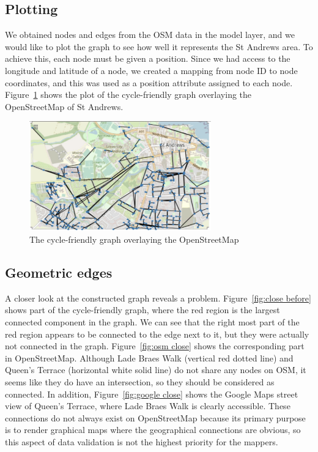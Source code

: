 \documentclass[12pt,a4paper]{report}
\begin{document}
\subsection{Plotting}
We obtained nodes and edges from the OSM data in the model layer, and we would like to plot the graph to see how well it represents the St Andrews area. To achieve this, each node must be given a position. Since we had access to the longitude and latitude of a node, we created a mapping from node ID to node coordinates, and this was used as a position attribute assigned to each node. Figure~\ref{fig:graph layout} shows the plot of the cycle-friendly graph overlaying the OpenStreetMap of St Andrews.

\begin{figure}[ht]
    \centering
    \includegraphics[width=0.7\textwidth]{diss_images/impl/graph_layout.png}
    \caption{The cycle-friendly graph overlaying the OpenStreetMap}
    \label{fig:graph layout}
\end{figure}

\subsection{Geometric edges}
A closer look at the constructed graph reveals a problem. Figure~\ref{fig:close before} shows part of the cycle-friendly graph, where the red region is the largest connected component in the graph. We can see that the right most part of the red region appears to be connected to the edge next to it, but they were actually not connected in the graph. Figure~\ref{fig:osm close} shows the corresponding part in OpenStreetMap. Although Lade Braes Walk (vertical red dotted line) and Queen's Terrace (horizontal white solid line) do not share any nodes on OSM, it seems like they do have an intersection, so they should be considered as connected. In addition, Figure~\ref{fig:google close} shows the Google Maps street view of Queen's Terrace, where Lade Braes Walk is clearly accessible. These connections do not always exist on OpenStreetMap because its primary purpose is to render graphical maps where the geographical connections are obvious, so this aspect of data validation is not the highest priority for the mappers.
\end{document}
